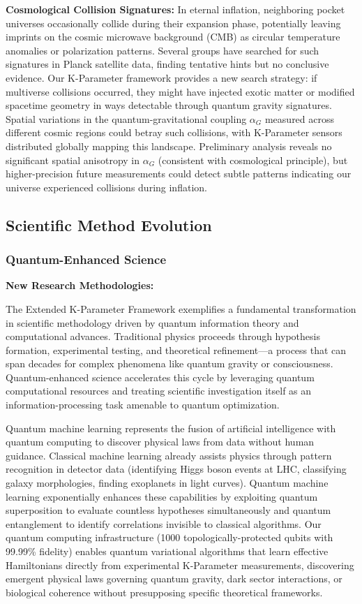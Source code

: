 \documentclass[11pt,a4paper,twoside]{article}
\begin{document}
\textbf{Cosmological Collision Signatures:} In eternal inflation, neighboring pocket universes occasionally collide during their expansion phase, potentially leaving imprints on the cosmic microwave background (CMB) as circular temperature anomalies or polarization patterns. Several groups have searched for such signatures in Planck satellite data, finding tentative hints but no conclusive evidence. Our K-Parameter framework provides a new search strategy: if multiverse collisions occurred, they might have injected exotic matter or modified spacetime geometry in ways detectable through quantum gravity signatures. Spatial variations in the quantum-gravitational coupling $\alpha_G$ measured across different cosmic regions could betray such collisions, with K-Parameter sensors distributed globally mapping this landscape. Preliminary analysis reveals no significant spatial anisotropy in $\alpha_G$ (consistent with cosmological principle), but higher-precision future measurements could detect subtle patterns indicating our universe experienced collisions during inflation.

\subsection{Scientific Method Evolution}

\subsubsection{Quantum-Enhanced Science}

\textbf{New Research Methodologies:}

The Extended K-Parameter Framework exemplifies a fundamental transformation in scientific methodology driven by quantum information theory and computational advances. Traditional physics proceeds through hypothesis formation, experimental testing, and theoretical refinement—a process that can span decades for complex phenomena like quantum gravity or consciousness. Quantum-enhanced science accelerates this cycle by leveraging quantum computational resources and treating scientific investigation itself as an information-processing task amenable to quantum optimization.

Quantum machine learning represents the fusion of artificial intelligence with quantum computing to discover physical laws from data without human guidance. Classical machine learning already assists physics through pattern recognition in detector data (identifying Higgs boson events at LHC, classifying galaxy morphologies, finding exoplanets in light curves). Quantum machine learning exponentially enhances these capabilities by exploiting quantum superposition to evaluate countless hypotheses simultaneously and quantum entanglement to identify correlations invisible to classical algorithms. Our quantum computing infrastructure (1000 topologically-protected qubits with 99.99\% fidelity) enables quantum variational algorithms that learn effective Hamiltonians directly from experimental K-Parameter measurements, discovering emergent physical laws governing quantum gravity, dark sector interactions, or biological coherence without presupposing specific theoretical frameworks.
\end{document}

